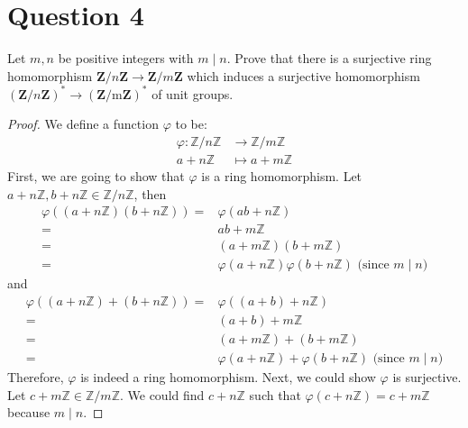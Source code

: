 \section{Question 4}

\begin{question}
    Let $m, n$ be positive integers with $m \mid n$. Prove that there is a surjective ring homomorphism $\mathbf{Z} / n \mathbf{Z} \rightarrow \mathbf{Z} / m \mathbf{Z}$ which induces a surjective homomorphism $(\mathbf{Z} / n \mathbf{Z})^* \rightarrow(\mathbf{Z} / \mathrm{m} \mathbf{Z})^*$ of unit groups.
\end{question}

\begin{answer}
    \begin{proof}
        We define a function $\varphi$ to be:
        \begin{equation}
            \begin{aligned}
                \varphi: \mathbb{Z}/n\mathbb{Z} &\to \mathbb{Z}/m\mathbb{Z}\\
                a + n\mathbb{Z} &\mapsto a + m\mathbb{Z}
            \end{aligned}
        \end{equation}
        First, we are going to show that $\varphi$ is a ring homomorphism. Let $a + n\mathbb{Z}, b + n\mathbb{Z} \in \mathbb{Z}/n \mathbb{Z}$, then
        \begin{equation}
            \begin{aligned}
                \varphi\left((a+n\mathbb{Z})(b+n\mathbb{Z})\right) = &\varphi(ab+n\mathbb{Z})\\
                = &ab + m\mathbb{Z}\\
                = &(a+m\mathbb{Z})(b+m\mathbb{Z})\\
                = &\varphi(a+n\mathbb{Z})\varphi(b+n\mathbb{Z}) \text{ (since $m\mid n$)}
            \end{aligned}
        \end{equation}
        and
        \begin{equation}
            \begin{aligned}
                \varphi\left((a+n\mathbb{Z})+(b+n\mathbb{Z})\right) = &\varphi\left((a+b)+n\mathbb{Z}\right)\\
                = &(a+b) + m\mathbb{Z}\\
                = &(a+m\mathbb{Z}) + (b+m\mathbb{Z})\\
                = &\varphi(a+n\mathbb{Z}) + \varphi(b+n\mathbb{Z}) \text{ (since $m\mid n$)}
            \end{aligned}
        \end{equation}
        Therefore, $\varphi$ is indeed a ring homomorphism. Next, we could show $\varphi$ is surjective. Let $c + m\mathbb{Z} \in \mathbb{Z}/m\mathbb{Z}$. We could find $c + n\mathbb{Z}$ such that $\varphi(c+n\mathbb{Z}) = c + m\mathbb{Z}$ because $m \mid n$.
        

\end{proof}
\end{answer}
